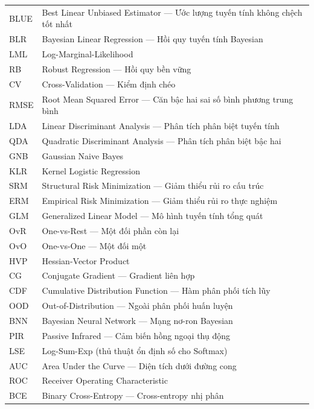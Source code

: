 \documentclass[oneside]{styles/hcmus-report}
\begin{document}
\begin{longtable}{p{} p{}}
BLUE    & Best Linear Unbiased Estimator --- Ước lượng tuyến tính không chệch tốt nhất \\
BLR     & Bayesian Linear Regression --- Hồi quy tuyến tính Bayesian \\
LML     & Log-Marginal-Likelihood \\
RB      & Robust Regression --- Hồi quy bền vững \\
CV      & Cross-Validation --- Kiểm định chéo \\
RMSE    & Root Mean Squared Error --- Căn bậc hai sai số bình phương trung bình \\

LDA     & Linear Discriminant Analysis --- Phân tích phân biệt tuyến tính \\
QDA     & Quadratic Discriminant Analysis --- Phân tích phân biệt bậc hai \\
GNB     & Gaussian Naive Bayes \\
KLR     & Kernel Logistic Regression \\
SRM     & Structural Risk Minimization --- Giảm thiểu rủi ro cấu trúc \\
ERM     & Empirical Risk Minimization --- Giảm thiểu rủi ro thực nghiệm \\
GLM     & Generalized Linear Model --- Mô hình tuyến tính tổng quát \\
OvR     & One-vs-Rest --- Một đối phần còn lại \\
OvO     & One-vs-One --- Một đối một \\
HVP     & Hessian-Vector Product \\
CG      & Conjugate Gradient --- Gradient liên hợp \\
CDF     & Cumulative Distribution Function --- Hàm phân phối tích lũy \\
OOD     & Out-of-Distribution --- Ngoài phân phối huấn luyện \\
BNN     & Bayesian Neural Network --- Mạng nơ-ron Bayesian \\
PIR     & Passive Infrared --- Cảm biến hồng ngoại thụ động \\
LSE     & Log-Sum-Exp (thủ thuật ổn định số cho Softmax) \\
AUC     & Area Under the Curve --- Diện tích dưới đường cong \\
ROC     & Receiver Operating Characteristic \\
BCE     & Binary Cross-Entropy --- Cross-entropy nhị phân \\


\end{longtable}
\end{document}

